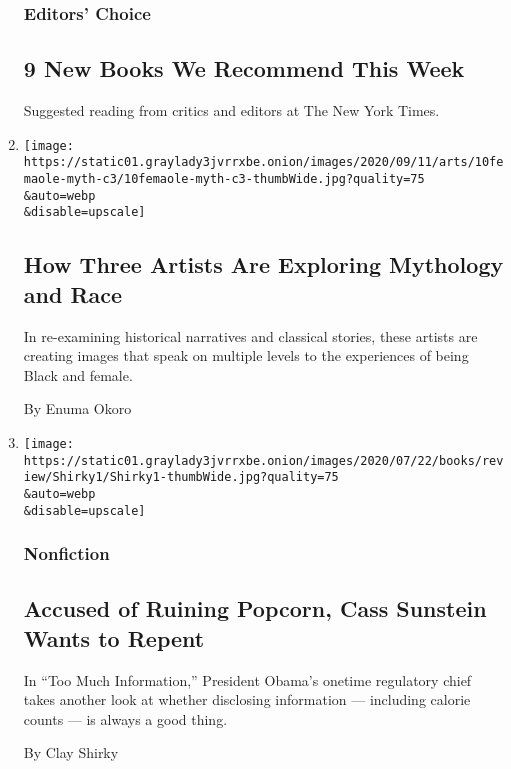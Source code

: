 \begin{enumerate}
  \hypertarget{editors-choice}{%
  \subsubsection{Editors' Choice}\label{editors-choice}}

  \hypertarget{9-new-books-we-recommend-this-week}{%
  \subsection{9 New Books We Recommend This
  Week}\label{9-new-books-we-recommend-this-week}}

  Suggested reading from critics and editors at The New York Times.
\item
  \href{/2020/09/10/arts/design/black-female-art-mythology.html}{}

  \texttt{[image: https://static01.graylady3jvrrxbe.onion/images/2020/09/11/arts/10femaole-myth-c3/10femaole-myth-c3-thumbWide.jpg?quality=75\\\&auto=webp\\\&disable=upscale]}

  \hypertarget{how-three-artists-are-exploring-mythology-and-race}{%
  \subsection{How Three Artists Are Exploring Mythology and
  Race}\label{how-three-artists-are-exploring-mythology-and-race}}

  In re-examining historical narratives and classical stories, these
  artists are creating images that speak on multiple levels to the
  experiences of being Black and female.

  By Enuma Okoro
\item
  \href{/2020/09/10/books/review/too-much-information-cass-sunstein.html}{}

  \texttt{[image: https://static01.graylady3jvrrxbe.onion/images/2020/07/22/books/review/Shirky1/Shirky1-thumbWide.jpg?quality=75\\\&auto=webp\\\&disable=upscale]}

  \hypertarget{nonfiction-3}{%
  \subsubsection{Nonfiction}\label{nonfiction-3}}

  \hypertarget{accused-of-ruining-popcorn-cass-sunstein-wants-to-repent}{%
  \subsection{Accused of Ruining Popcorn, Cass Sunstein Wants to
  Repent}\label{accused-of-ruining-popcorn-cass-sunstein-wants-to-repent}}

  In ``Too Much Information,'' President Obama's onetime regulatory
  chief takes another look at whether disclosing information ---
  including calorie counts --- is always a good thing.

  By Clay Shirky
\end{enumerate}

